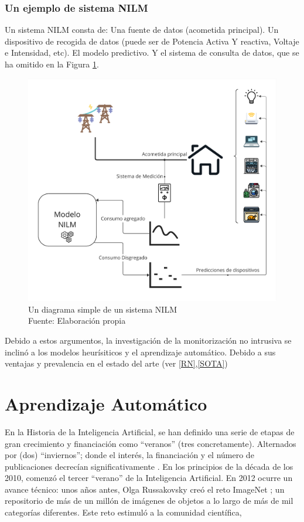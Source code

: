 \subsubsection{Un ejemplo de sistema NILM}
Un sistema NILM consta de: Una fuente de datos (acometida principal). Un dispositivo de recogida de datos (puede ser de Potencia Activa Y reactiva, Voltaje e Intensidad, etc). El modelo predictivo. Y el sistema de consulta de datos, que se ha omitido en la Figura \ref{diagramaNILM}.
\begin{figure}
    \centering
    \includegraphics[width=450px]{images/SistemaNILM.pdf}
    \caption{Un diagrama simple de un sistema NILM \\ Fuente: Elaboración propia}
    \label{diagramaNILM}
\end{figure}

Debido a estos argumentos, la investigación de la monitorización no intrusiva se inclinó a los modelos heurísiticos y el aprendizaje automático. Debido a sus ventajas y prevalencia en el estado del arte (ver \ref{RN},\ref{SOTA})


\section{Aprendizaje Automático}

En la Historia de la Inteligencia Artificial, se han definido una serie de etapas de gran crecimiento y financiación como  \foreignquote{spanish}{veranos} \autocite{briefAIHistory} (tres concretamente). Alternados por (dos) \foreignquote{spanish}{inviernos}; donde el interés, la financiación y el número de publicaciones decrecían significativamente \autocite{briefAIHistory}.
En los principios de la década de los 2010, comenzó el tercer \enquote{verano} de la Inteligencia Artificial. En 2012 ocurre un avance técnico: unos años antes, Olga Russakovsky creó el reto ImageNet \autocite{ImageNetRussakovsky}; un repositorio de más de un millón de imágenes de objetos a lo largo de más de mil categorías diferentes. 
Este reto estimuló a la comunidad científica, 

